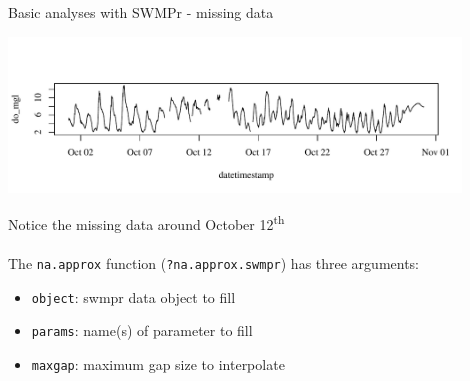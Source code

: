 \documentclass[xcolor=dvipsnames,serif]{beamer}\usepackage[]{graphicx}\usepackage[]{color}
\newenvironment{knitrout}{}{} %
\begin{document}
\begin{frame}[fragile]{Basic analyses with SWMPr - missing data}
\begin{knitrout}\scriptsize
{}\color{fgcolor}

{\centering \includegraphics[width=0.9\textwidth]{figure/unnamed-chunk-6-1} 

}



\end{knitrout}
Notice the missing data around October 12\textsuperscript{th} \\~\\
The \texttt{na.approx} function (\texttt{?na.approx.swmpr}) has three arguments:
\begin{itemize}
\item \texttt{object}: swmpr data object to fill
\item \texttt{params}: name(s) of parameter to fill
\item \texttt{maxgap}: maximum gap size to interpolate
\end{itemize}
\end{frame}
\end{document}
